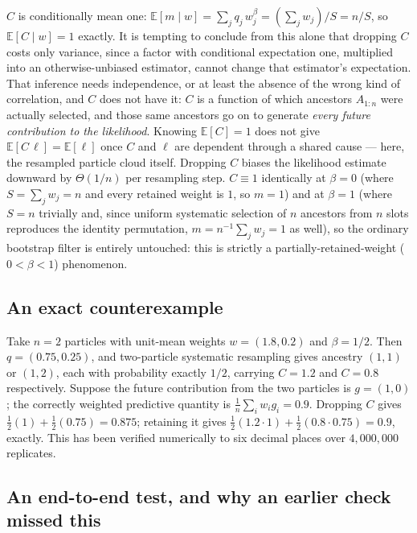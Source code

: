 \documentclass[10pt]{article}
\begin{document}
$C$ is conditionally mean one: $\mathbb E[m\mid w] = \sum_j q_j\,w_j^\beta =
(\sum_j w_j)/S = n/S$, so $\mathbb E[C\mid w]=1$ exactly. It is tempting to
conclude from this alone that dropping $C$ costs only variance, since a
factor with conditional expectation one, multiplied into an
otherwise-unbiased estimator, cannot change that estimator's expectation.
That inference needs independence, or at least the absence of the wrong kind
of correlation, and $C$ does not have it: $C$ is a function of which
ancestors $A_{1:n}$ were actually selected, and those same ancestors go on
to generate \emph{every future contribution to the likelihood}. Knowing
$\mathbb E[C]=1$ does not give $\mathbb E[C\,\ell]=\mathbb E[\ell]$ once $C$
and $\ell$ are dependent through a shared cause — here, the resampled
particle cloud itself. Dropping $C$ biases the likelihood estimate downward
by $\Theta(1/n)$ per resampling step. $C\equiv1$ identically at $\beta=0$
(where $S=\sum_j w_j=n$ and every retained weight is $1$, so $m=1$) and at
$\beta=1$ (where $S=n$ trivially and, since uniform systematic selection of
$n$ ancestors from $n$ slots reproduces the identity permutation, $m =
n^{-1}\sum_j w_j = 1$ as well), so the ordinary bootstrap filter is entirely
untouched: this is strictly a partially-retained-weight ($0<\beta<1$)
phenomenon.

\subsection*{An exact counterexample}

Take $n=2$ particles with unit-mean weights $w=(1.8,0.2)$ and $\beta=1/2$.
Then $q=(0.75,0.25)$, and two-particle systematic resampling gives ancestry
$(1,1)$ or $(1,2)$, each with probability exactly $1/2$, carrying $C=1.2$
and $C=0.8$ respectively. Suppose the future contribution from the two
particles is $g=(1,0)$; the correctly weighted predictive quantity is
$\frac1n\sum_i w_i g_i = 0.9$. Dropping $C$ gives
$\frac12(1)+\frac12(0.75)=0.875$; retaining it gives
$\frac12(1.2\cdot1)+\frac12(0.8\cdot0.75)=0.9$, exactly. This has been
verified numerically to six decimal places over $4{,}000{,}000$ replicates.

\subsection*{An end-to-end test, and why an earlier check missed this}
\end{document}
